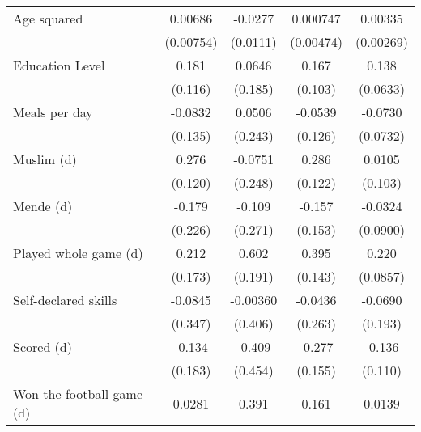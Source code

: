 {\begin{tabular}{l*{4}{c}}
Age squared         &     0.00686         &     -0.0277\sym{**} &    0.000747         &     0.00335         \\
                    &   (0.00754)         &    (0.0111)         &   (0.00474)         &   (0.00269)         \\
[1em]
Education Level     &       0.181         &      0.0646         &       0.167         &       0.138\sym{**} \\
                    &     (0.116)         &     (0.185)         &     (0.103)         &    (0.0633)         \\
[1em]
Meals per day       &     -0.0832         &      0.0506         &     -0.0539         &     -0.0730         \\
                    &     (0.135)         &     (0.243)         &     (0.126)         &    (0.0732)         \\
[1em]
Muslim (d)          &       0.276\sym{**} &     -0.0751         &       0.286\sym{**} &      0.0105         \\
                    &     (0.120)         &     (0.248)         &     (0.122)         &     (0.103)         \\
[1em]
Mende (d)           &      -0.179         &      -0.109         &      -0.157         &     -0.0324         \\
                    &     (0.226)         &     (0.271)         &     (0.153)         &    (0.0900)         \\
[1em]
Played whole game (d)&       0.212         &       0.602\sym{***}&       0.395\sym{***}&       0.220\sym{**} \\
                    &     (0.173)         &     (0.191)         &     (0.143)         &    (0.0857)         \\
[1em]
Self-declared skills&     -0.0845         &    -0.00360         &     -0.0436         &     -0.0690         \\
                    &     (0.347)         &     (0.406)         &     (0.263)         &     (0.193)         \\
[1em]
Scored (d)          &      -0.134         &      -0.409         &      -0.277\sym{*}  &      -0.136         \\
                    &     (0.183)         &     (0.454)         &     (0.155)         &     (0.110)         \\
[1em]
Won the football game (d)&      0.0281         &       0.391\sym{*}  &       0.161         &      0.0139         \\

\end{tabular}}
